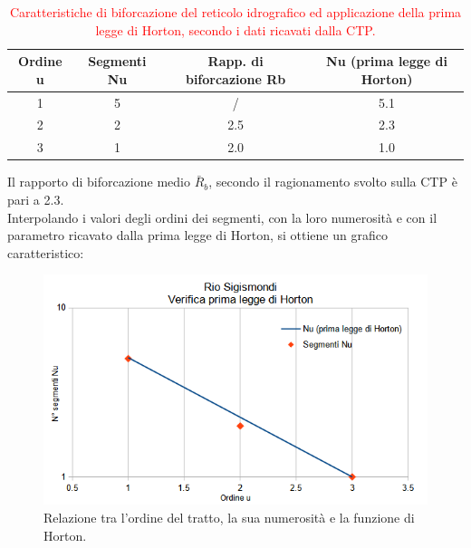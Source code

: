 \begin{table}[H] \centering
    \caption{\textcolor{red}{Caratteristiche di biforcazione del reticolo idrografico ed applicazione della prima legge di Horton, secondo i dati ricavati dalla CTP.}}
    \label{tab:rapp_biforcazione_1_horton}
    \begin{tabular}{ cccc }
\toprule
    Ordine u & Segmenti Nu & Rapp. di biforcazione Rb & Nu (prima legge di Horton) \\
\midrule    
    1        & 5           &   /                     & 5.1                        \\
    2        & 2           & 2.5                      & 2.3                        \\
    3        & 1           & 2.0                      & 1.0                       \\
\bottomrule    
\end{tabular}
\end{table}
\noindent Il rapporto di biforcazione medio $\bar{R}_b$, secondo il ragionamento svolto sulla CTP è pari a \num{2.3}.\\
Interpolando i valori degli ordini dei segmenti, con la loro numerosità e con il parametro ricavato dalla prima legge di Horton, si ottiene un grafico caratteristico:
\begin{figure}[H]\centering
    \includegraphics[scale=.75]{immagini/legge_horton.png}
    \caption{Relazione tra l'ordine del tratto, la sua numerosità e la funzione di Horton.}
    \label{legge_horton}
\end{figure}

